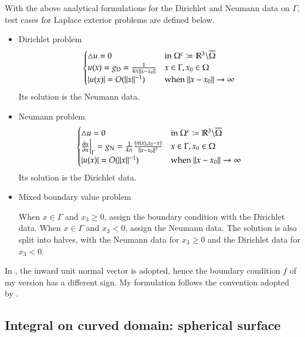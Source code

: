 \documentclass[11pt, a4paper]{article}
\begin{document}
With the above analytical formulations for the Dirichlet and Neumann data on $\Gamma$,
test cases for Laplace exterior problems are defined below.

\begin{itemize}
\item Dirichlet problem
  \begin{equation}
    \begin{cases}
      \triangle u = 0 & \text{in $\Omega^{\rm c}\coloneqq\mathbb{R}^3\backslash\overline{\Omega}$} \\
      u(x) = g_{\rm D} = \frac{1}{4\pi\lVert x-x_0\rVert} & x\in\Gamma, x_0\in\Omega \\
      \lvert u(x)\rvert = O(\lVert x\rVert^{-1}) & \text{when $\lVert x-x_0\rVert\rightarrow\infty$}
    \end{cases}
  \end{equation}
  Its solution is the Neumann data.
\item Neumann problem
  \begin{equation}
    \begin{cases}
      \triangle u = 0 & \text{in $\Omega^{\rm c}\coloneqq\mathbb{R}^3\backslash\overline{\Omega}$} \\
      \frac{\partial u}{\partial n}\Big\vert_{\Gamma} = g_{\rm N} = \frac{1}{4\pi}\frac{(n(x),
        x_0-x)}{\lVert x-x_0\rVert^3} & x\in\Gamma, x_0\in\Omega \\
      \lvert u(x)\rvert = O(\lVert x\rVert^{-1}) & \text{when $\lVert x-x_0\rVert\rightarrow\infty$}
    \end{cases}
  \end{equation}
  Its solution is the Dirichlet data.
\item Mixed boundary value problem

  When $x\in\Gamma$ and $x_3\geq 0$, assign the boundary condition with the Dirichlet data.
  When $x\in\Gamma$ and $x_3<0$, assign the Neumann data. The solution is also split into
  halves, with the Neumann data for $x_3\geq 0$ and the Dirichlet data for $x_3<0$.
\end{itemize}

\begin{mycomment}
  In \cite{ErichsenEfficient1998}, the inward unit normal vector is adopted, hence the
  boundary condition $f$ of my version has a different sign. My formulation follows the
  convention adopted by \cite{SteinbachNumerical2007}.
\end{mycomment}

\subsection{Integral on curved domain: spherical surface}
\end{document}
